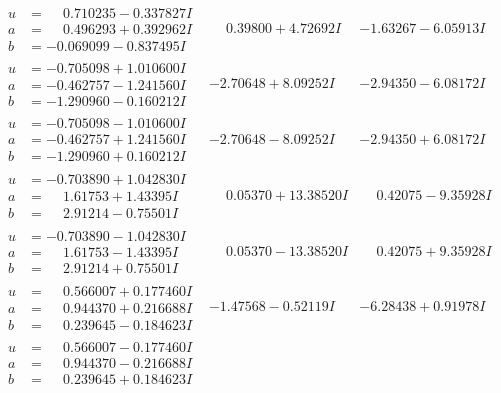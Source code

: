 \documentclass[1p]{elsarticle_modified}
\theoremstyle{definition}
\begin{document}
$$\begin{array}{c|c|c}
\begin{aligned}
u &= \phantom{-}0.710235 - 0.337827 I \\
a &= \phantom{-}0.496293 + 0.392962 I \\
b &= -0.069099 - 0.837495 I\end{aligned}
 & \phantom{-}0.39800 + 4.72692 I & -1.63267 - 6.05913 I \\ \hline\begin{aligned}
u &= -0.705098 + 1.010600 I \\
a &= -0.462757 - 1.241560 I \\
b &= -1.290960 - 0.160212 I\end{aligned}
 & -2.70648 + 8.09252 I & -2.94350 - 6.08172 I \\ \hline\begin{aligned}
u &= -0.705098 - 1.010600 I \\
a &= -0.462757 + 1.241560 I \\
b &= -1.290960 + 0.160212 I\end{aligned}
 & -2.70648 - 8.09252 I & -2.94350 + 6.08172 I \\ \hline\begin{aligned}
u &= -0.703890 + 1.042830 I \\
a &= \phantom{-}1.61753 + 1.43395 I \\
b &= \phantom{-}2.91214 - 0.75501 I\end{aligned}
 & \phantom{-}0.05370 + 13.38520 I & \phantom{-}0.42075 - 9.35928 I \\ \hline\begin{aligned}
u &= -0.703890 - 1.042830 I \\
a &= \phantom{-}1.61753 - 1.43395 I \\
b &= \phantom{-}2.91214 + 0.75501 I\end{aligned}
 & \phantom{-}0.05370 - 13.38520 I & \phantom{-}0.42075 + 9.35928 I \\ \hline\begin{aligned}
u &= \phantom{-}0.566007 + 0.177460 I \\
a &= \phantom{-}0.944370 + 0.216688 I \\
b &= \phantom{-}0.239645 - 0.184623 I\end{aligned}
 & -1.47568 - 0.52119 I & -6.28438 + 0.91978 I \\ \hline\begin{aligned}
u &= \phantom{-}0.566007 - 0.177460 I \\
a &= \phantom{-}0.944370 - 0.216688 I \\
b &= \phantom{-}0.239645 + 0.184623 I\end{aligned}

\end{array}$$
\end{document}

